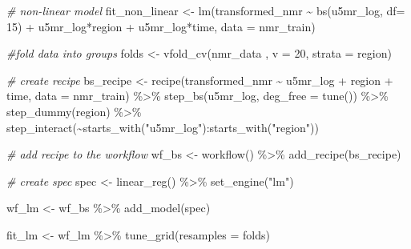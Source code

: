 \documentclass[
]{article}
\newenvironment{Shaded}{\begin{snugshade}}{\end{snugshade}}
\newcommand{\AttributeTok}[1]{\textcolor[rgb]{0.77,0.63,0.00}{#1}}
\newcommand{\CommentTok}[1]{\textcolor[rgb]{0.56,0.35,0.01}{\textit{#1}}}
\newcommand{\DecValTok}[1]{\textcolor[rgb]{0.00,0.00,0.81}{#1}}
\newcommand{\FunctionTok}[1]{\textcolor[rgb]{0.00,0.00,0.00}{#1}}
\newcommand{\NormalTok}[1]{#1}
\newcommand{\OtherTok}[1]{\textcolor[rgb]{0.56,0.35,0.01}{#1}}
\newcommand{\SpecialCharTok}[1]{\textcolor[rgb]{0.00,0.00,0.00}{#1}}
\newcommand{\StringTok}[1]{\textcolor[rgb]{0.31,0.60,0.02}{#1}}
\begin{document}
\begin{Shaded}
\begin{Highlighting}[]
\CommentTok{\# non{-}linear model}
\NormalTok{fit\_non\_linear }\OtherTok{\textless{}{-}} \FunctionTok{lm}\NormalTok{(transformed\_nmr }\SpecialCharTok{\textasciitilde{}} \FunctionTok{bs}\NormalTok{(u5mr\_log, }\AttributeTok{df=} \DecValTok{15}\NormalTok{) }\SpecialCharTok{+}\NormalTok{ u5mr\_log}\SpecialCharTok{*}\NormalTok{region }\SpecialCharTok{+}\NormalTok{ u5mr\_log}\SpecialCharTok{*}\NormalTok{time, }\AttributeTok{data =}\NormalTok{ nmr\_train)}

\CommentTok{\#fold data into groups}
\NormalTok{folds }\OtherTok{\textless{}{-}} \FunctionTok{vfold\_cv}\NormalTok{(nmr\_data , }\AttributeTok{v =} \DecValTok{20}\NormalTok{, }\AttributeTok{strata =}\NormalTok{ region)}

\CommentTok{\# create recipe}
\NormalTok{bs\_recipe }\OtherTok{\textless{}{-}} \FunctionTok{recipe}\NormalTok{(transformed\_nmr }\SpecialCharTok{\textasciitilde{}}\NormalTok{ u5mr\_log }\SpecialCharTok{+}\NormalTok{ region }\SpecialCharTok{+}\NormalTok{ time,}
              \AttributeTok{data =}\NormalTok{ nmr\_train) }\SpecialCharTok{\%\textgreater{}\%} 
  \FunctionTok{step\_bs}\NormalTok{(u5mr\_log, }\AttributeTok{deg\_free =} \FunctionTok{tune}\NormalTok{()) }\SpecialCharTok{\%\textgreater{}\%} 
  \FunctionTok{step\_dummy}\NormalTok{(region) }\SpecialCharTok{\%\textgreater{}\%} 
  \FunctionTok{step\_interact}\NormalTok{(}\SpecialCharTok{\textasciitilde{}}\FunctionTok{starts\_with}\NormalTok{(}\StringTok{"u5mr\_log"}\NormalTok{)}\SpecialCharTok{:}\FunctionTok{starts\_with}\NormalTok{(}\StringTok{"region"}\NormalTok{))}

\CommentTok{\# add recipe to the workflow}
\NormalTok{wf\_bs }\OtherTok{\textless{}{-}} \FunctionTok{workflow}\NormalTok{() }\SpecialCharTok{\%\textgreater{}\%}
  \FunctionTok{add\_recipe}\NormalTok{(bs\_recipe)}

\CommentTok{\# create spec}
\NormalTok{spec }\OtherTok{\textless{}{-}} \FunctionTok{linear\_reg}\NormalTok{() }\SpecialCharTok{\%\textgreater{}\%}
  \FunctionTok{set\_engine}\NormalTok{(}\StringTok{"lm"}\NormalTok{)}


\NormalTok{wf\_lm }\OtherTok{\textless{}{-}}\NormalTok{ wf\_bs }\SpecialCharTok{\%\textgreater{}\%} 
  \FunctionTok{add\_model}\NormalTok{(spec) }

\NormalTok{fit\_lm }\OtherTok{\textless{}{-}}\NormalTok{ wf\_lm }\SpecialCharTok{\%\textgreater{}\%}
  \FunctionTok{tune\_grid}\NormalTok{(}\AttributeTok{resamples =}\NormalTok{ folds)}
\end{Highlighting}
\end{Shaded}
\end{document}
